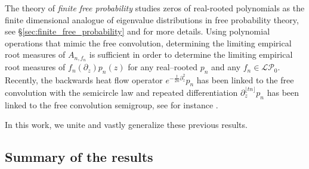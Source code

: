 \documentclass[reqno]{amsart}
\newcommand{\1}{\mathbf{1}}
\newcommand{\LP}{\mathcal{LP}}
\theoremstyle{plain}
\theoremstyle{definition}
\theoremstyle{remark}
\numberwithin{equation}{section}
\begin{document}
The theory of \emph{finite free probability} studies zeros of real-rooted polynomials as the finite dimensional analogue of eigenvalue distributions in free probability theory, see \S \ref{sec:finite_free_probability} and \cite{Marcus-Spielman-Srivastava2015-1,Marcus-Spielman-Srivastava2015-2,Marcus-Spielman-Srivastava2022,Arizmendi-Perales2018,Jalowy-Kabluchko-Marynych2025} for more details. Using polynomial operations that mimic the free convolution, determining the limiting empirical root measures of $A_{n,f_n}$ is sufficient in order to determine the limiting empirical root measures of $f_n(\partial_{z})p_n(z)$ for any real--rooted $p_n$ and any $f_n\in\LP_{0}$. 
Recently, the backwards heat flow operator $e^{-\frac{t}{2n}\partial_z^2}p_n$ has been linked to the free convolution with the semicircle law and repeated differentiation $\partial_z^{\lfloor tn\rfloor}p_n$ has been linked to the free convolution semigroup, see for instance \cite{Arizmendi-GarzaVargas-Perales2023,Steinerberger2019,Steinerberger2020,Campbell-ORourke-Renfrew2024,Hall-Ho-Jalowy-Kabluchko2023heat,Hofert,Hoskins-Kabluchko2021,Hoskins-Steinerberger2022,campbell2025freeinfinitedivisibilityfractional,Kabluchko2022leeyang,Hall-Ho-Jalowy-Kabluchko2023}.
 
In this work, we unite and vastly generalize these previous results. 
\subsection{Summary of the results}
\end{document}
